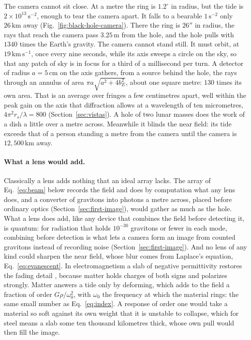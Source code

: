 The camera cannot sit close. At a metre the ring is $1.2^\circ$ in radius, but the
tide is $2\times10^{13}\,\mathrm{s^{-2}}$, enough to tear the camera apart. It
falls to a bearable $1\,\mathrm{s^{-2}}$ only $26\,\mathrm{km}$ away
(Fig.~\ref{fig:black-hole-camera}). There the ring is $26''$ in radius, the
rays that reach the camera pass $3.25\,\mathrm{m}$ from the hole, and the hole
pulls with $1340$ times the Earth's gravity. The camera cannot stand still. It
must orbit, at $19\,\mathrm{km\,s^{-1}}$, once every nine seconds, while its axis
sweeps a circle on the sky, so that any patch of sky is in focus for a third of
a millisecond per turn. A detector of radius $a = 5\,\mathrm{cm}$ on the axis gathers,
from a source behind the hole, the rays through an annulus of area
$\pi a\sqrt{a^2 + 4b_E^2}$, about one square metre: $130$ times its
own area. That is an average over fringes a few centimetres apart, well within
the peak gain on the axis that diffraction allows at a wavelength of
ten micrometres, $4\pi^2 r_s/\lambda = 800$
(Section~\ref{sec:vistas}). A hole of two lunar masses does the work of a dish a
little over a metre across. Meanwhile it blinds the near field: its tide exceeds
that of a person standing a metre from the camera until the camera is
$12{,}500\,\mathrm{km}$ away.

\paragraph{What a lens would add.} Classically a lens adds nothing that an ideal
array lacks. The array of Eq.~\eqref{eq:beam} below records the field and does by
computation what any lens does, and a converter of gravitons into photons a
metre across, placed before ordinary optics (Section~\ref{sec:first-image}),
would gather as much as the hole. What a lens does add, like any device that
combines the field before detecting it, is quantum: for radiation that holds
$10^{-30}$ gravitons or fewer in each mode, combining before detection is what lets a
camera form an image from counted gravitons instead of recording noise
(Section~\ref{sec:first-image}). And no lens of any kind could sharpen the
near field, whose blur comes from Laplace's equation, Eq.~\eqref{eq:evanescent}. In
electromagnetism a slab of negative permittivity restores the fading detail
\cite{Pendry2000}, because matter holds charges of both signs and polarizes
strongly. Matter answers a tide only by deforming, which adds to the field a
fraction of order $G\rho/\omega_0^2$, with $\omega_0$ the frequency at which the
material rings: the same small number as Eq.~\eqref{eq:index}. A response of
order one would take a material so soft against its own weight that it is
unstable to collapse, which for steel means a slab some ten thousand kilometres
thick, whose own pull would then fill the image.

